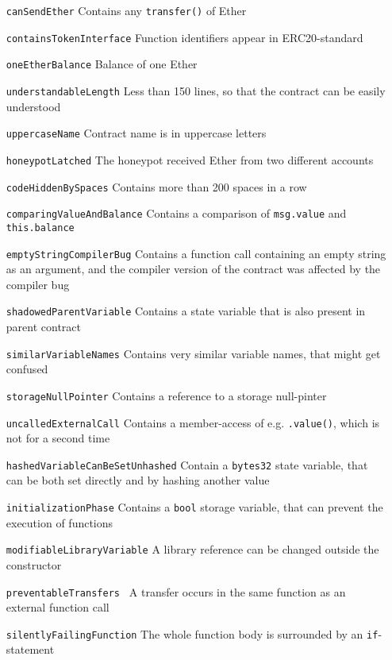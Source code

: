 \begin{itemize}
	\item[\texttt{canSendEther}] Contains any \texttt{transfer()} of Ether
	\item[\texttt{containsTokenInterface}] Function identifiers appear in ERC20-standard
	\item[\texttt{oneEtherBalance}] Balance of one Ether
	\item[\texttt{understandableLength}] Less than 150 lines, so that the contract can be easily understood
	\item[\texttt{uppercaseName}] Contract name is in uppercase letters
	\item[\texttt{honeypotLatched}] The honeypot received Ether from two different accounts
	\item[\texttt{codeHiddenBySpaces}] Contains more than 200 spaces in a row
	\item[\texttt{comparingValueAndBalance}] Contains a comparison of \texttt{msg.value} and \texttt{this.balance}
	\item[\texttt{emptyStringCompilerBug}] Contains a function call containing an empty string as an argument, and the compiler version of the contract was affected by the compiler bug
	\item[\texttt{shadowedParentVariable}] Contains a state variable that is also present in parent contract
	\item[\texttt{similarVariableNames}] Contains very similar variable names, that might get confused
	\item[\texttt{storageNullPointer}] Contains a reference to a storage null-pinter
	\item[\texttt{uncalledExternalCall}] Contains a member-access of e.g. \texttt{.value()}, which is not for a second time
	\item[\texttt{hashedVariableCanBeSetUnhashed}] Contain a \texttt{bytes32} state variable, that can be both set directly and by hashing another value
	\item[\texttt{initializationPhase}] Contains a \texttt{bool} storage variable, that can prevent the execution of functions
	\item[\texttt{modifiableLibraryVariable}] A library reference can be changed outside the constructor
	\item[\texttt{preventableTransfers }] A transfer occurs in the same function as an external function call
	\item[\texttt{silentlyFailingFunction}] The whole function body is surrounded by an \texttt{if}-statement
\end{itemize}

\pagebreak{}
